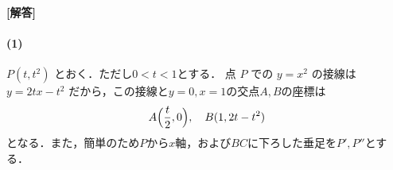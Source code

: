 \documentclass[../../main.tex]{subfiles}
\begin{document}
\begin{oframed}
  
\end{oframed}

{\bf [解答]}

\paragraph{(1)}

$P(t, t^2)$ とおく．ただし$0 < t < 1$とする．
点 $P$ での $y=x^2$ の接線は $y = 2tx - t^2$ だから，この接線と$y=0,x=1$の交点$A,B$の座標は
\begin{align}
  A\Bigl(\dfrac{t}{2}, 0\Bigr), \quad B(1, 2t-t^2) \label{eq:1}
\end{align}
となる．また，簡単のため$P$から$x$軸，および$BC$に下ろした垂足を$P',P''$とする．
\end{document}
